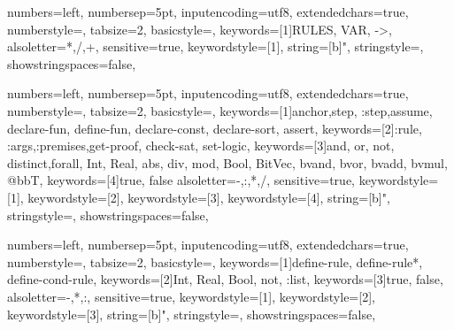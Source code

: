 

\lstset{style=mystyle}

{
  numbers=left,
  numbersep=5pt,
  inputencoding=utf8,
  extendedchars=true,
  numberstyle=\footnotesize,
  tabsize=2,
  basicstyle={\ttfamily\scriptsize\upshape},
  keywords=[1]{RULES, VAR, ->},
  alsoletter={*,/,+},
  sensitive=true,
  keywordstyle={[1]\bfseries\color{ForestGreen}},
  string=[b]{"},
  stringstyle=\color{orange},
  showstringspaces=false,
}

{
  numbers=left,
  numbersep=5pt,
  inputencoding=utf8,
  extendedchars=true,
  numberstyle=\footnotesize,
  tabsize=2,
  basicstyle={\ttfamily\scriptsize\upshape},
  keywords=[1]{anchor,step, :step,assume, declare-fun, define-fun, declare-const, declare-sort, assert},
  keywords=[2]{:rule, :args,:premises,get-proof, check-sat, set-logic},
  keywords=[3]{and, or, not, distinct,forall, Int, Real, abs, div, mod, Bool, BitVec, bvand, bvor, bvadd, bvmul, @bbT},
  keywords=[4]{true, false}
  alsoletter={-,:,*,/},
  sensitive=true,
  keywordstyle={[1]\bfseries\color{mylpurple}},
  keywordstyle={[2]\bfseries\color{RoyalBlue}},
  keywordstyle={[3]\bfseries\color{mypurple}},
  keywordstyle={[4]\bfseries\color{green}},
  string=[b]{"},
  stringstyle=\color{orange},
  showstringspaces=false,
}


{
  numbers=left,
  numbersep=5pt,
  inputencoding=utf8,
  extendedchars=true,
  numberstyle=\footnotesize,
  tabsize=2,
  basicstyle={\ttfamily\scriptsize\upshape},
  keywords=[1]{define-rule, define-rule*, define-cond-rule},
  keywords=[2]{Int, Real, Bool, not, :list},
  keywords=[3]{true, false},
  alsoletter={-,*,:},
  sensitive=true,
  keywordstyle={[1]\color{mylpurple}},
  keywordstyle={[2]\color{RoyalBlue}},
  keywordstyle={[3]\color{mypurple}},
  string=[b]{"},
  stringstyle=\color{orange},
  showstringspaces=false,
}

\newcommand{\sub}[1]{\ensuremath{_{\!#1}}}


